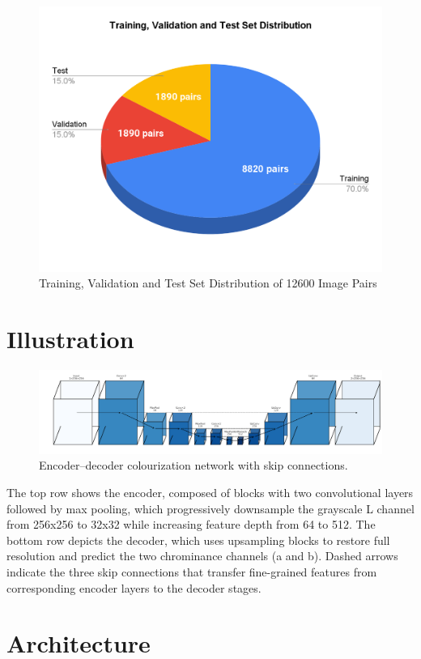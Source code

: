 \documentclass{article} %
\begin{document}
\begin{figure}[htbp]            %
  \centering
  \includegraphics[width=0.65\linewidth]{Figs/dataset1.png}
  \caption{Training, Validation and Test Set Distribution of 12600 Image Pairs}
  \label{fig:dataset}
\end{figure}

\section{Illustration}

\begin{figure}[htbp]            %
  \centering
  \includegraphics[width=0.9\linewidth]{Figs/architecture.png}
  \caption{Encoder–decoder colourization network with skip connections.}
  \label{fig:architecture}
\end{figure}

The top row shows the encoder, composed of blocks with two convolutional layers followed by max pooling, which progressively downsample the grayscale L channel from 256x256 to 32x32 
while increasing feature depth from 64 to 512. The bottom row depicts the decoder, which uses upsampling blocks to restore full resolution and predict the two chrominance channels 
(a and b). Dashed arrows indicate the three skip connections that transfer fine-grained features from corresponding encoder layers to the decoder stages.

\section{Architecture}
\end{document}
